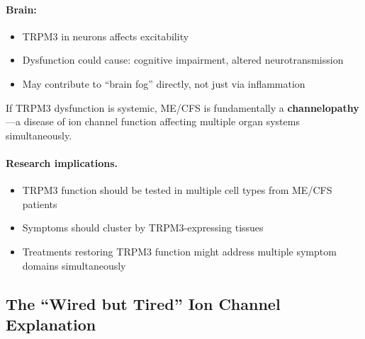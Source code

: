 \begin{open_question}
\paragraph{Brain:}
\begin{itemize}
    \item TRPM3 in neurons affects excitability
    \item Dysfunction could cause: cognitive impairment, altered neurotransmission
    \item May contribute to ``brain fog'' directly, not just via inflammation
\end{itemize}

If TRPM3 dysfunction is systemic, ME/CFS is fundamentally a \textbf{channelopathy}---a disease of ion channel function affecting multiple organ systems simultaneously.
\end{open_question}

\paragraph{Research implications.}
\begin{itemize}
    \item TRPM3 function should be tested in multiple cell types from ME/CFS patients
    \item Symptoms should cluster by TRPM3-expressing tissues
    \item Treatments restoring TRPM3 function might address multiple symptom domains simultaneously
\end{itemize}

\subsection{The ``Wired but Tired'' Ion Channel Explanation}

